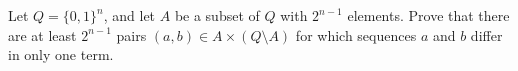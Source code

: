 Let $Q=\{0,1\}^n$, and let $A$ be a subset of $Q$ with $2^{n-1}$ elements. Prove that there are at least $2^{n-1}$ pairs $(a,b)\in A\times (Q\setminus A)$ for which sequences $a$ and $b$ differ in only one term.